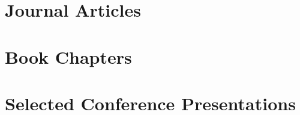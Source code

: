 \documentclass[12pt,letterpaper,roman]{moderncv}        %
\begin{document}

\section{Journal Articles}

\printbibliography[type=article,heading=none]



\section{Book Chapters}
\printbibliography[type=incollection,heading=none]

\section{Selected Conference Presentations}
\end{document}

